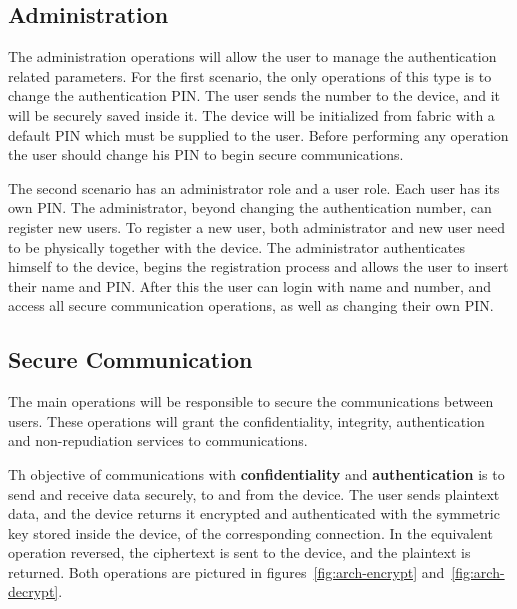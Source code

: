 \subsection{Administration}\label{chap:arch:ops:admin}

The administration operations will allow the user to manage the authentication related parameters.
For the first scenario, the only operations of this type is to change the authentication \ac{PIN}. The user sends the number to the device, and it will be securely saved inside it. The device will be initialized from fabric with a default \ac{PIN} which must be supplied to the user. Before performing any operation the user should change his PIN to begin secure communications.

The second scenario has an administrator role and a user role. Each user has its own \ac{PIN}. The administrator, beyond changing the authentication number, can register new users. To register a new user, both administrator and new user need to be physically together with the device. The administrator authenticates himself to the device, begins the registration process and allows the user to insert their name and \ac{PIN}. After this the user can login with name and number, and access all secure communication operations, as well as changing their own \ac{PIN}.

\subsection{Secure Communication}\label{chap:arch:ops:comms}

The main operations will be responsible to secure the communications between users. These operations will grant the confidentiality, integrity, authentication and non-repudiation services to communications.

Th objective of communications with \textbf{confidentiality} and \textbf{authentication} is to send and receive data securely, to and from the device. The user sends plaintext data, and the device returns it encrypted and authenticated with the symmetric key stored inside the device, of the corresponding connection. In the equivalent operation reversed, the ciphertext is sent to the device, and the plaintext is returned.
Both operations are pictured in figures~\ref{fig:arch-encrypt} and~\ref{fig:arch-decrypt}.

